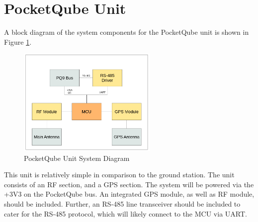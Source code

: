 \graphicspath{{./figures}}

\section{PocketQube Unit}
A block diagram of the system components for the PocketQube unit is shown in Figure \ref{fig:pqunit_system}.

\begin{figure}[!htb]
  \centering
  \includegraphics[width=0.6\textwidth]{pqunit_system}
  \caption{PocketQube Unit System Diagram}
  \label{fig:pqunit_system}
\end{figure}

This unit is relatively simple in comparison to the ground station. The unit consists of an RF section, and a GPS section. The system will be powered via the +3V3 on the PocketQube bus. An integrated GPS module, as well as RF module, should be included. Further, an RS-485 line transceiver should be included to cater for the RS-485 protocol, which will likely connect to the MCU via UART.